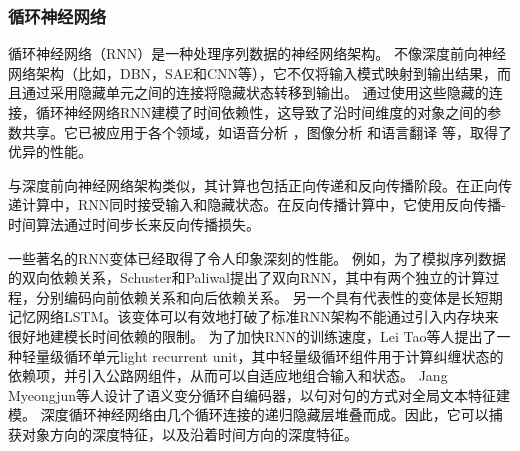 \subsubsection{循环神经网络}
循环神经网络（RNN）是一种处理序列数据的神经网络架构。%
不像深度前向神经网络架构（比如，DBN，SAE和CNN等），它不仅将输入模式映射到输出结果，而且通过采用隐藏单元之间的连接将隐藏状态转移到输出。%
通过使用这些隐藏的连接，循环神经网络RNN建模了时间依赖性，这导致了沿时间维度的对象之间的参数共享。它已被应用于各个领域，如语音分析%
，图像分析%
和语言翻译%
等，取得了优异的性能。

与深度前向神经网络架构类似，其计算也包括正向传递和反向传播阶段。在正向传递计算中，RNN同时接受输入和隐藏状态。在反向传播计算中，它使用反向传播-时间算法通过时间步长来反向传播损失。

一些著名的RNN变体已经取得了令人印象深刻的性能。%
例如，为了模拟序列数据的双向依赖关系，Schuster和Paliwal提出了双向RNN，其中有两个独立的计算过程，分别编码向前依赖关系和向后依赖关系。%
另一个具有代表性的变体是长短期记忆网络LSTM。该变体可以有效地打破了标准RNN架构不能通过引入内存块来很好地建模长时间依赖的限制。%
为了加快RNN的训练速度，Lei Tao等人提出了一种轻量级循环单元light recurrent unit，其中轻量级循环组件用于计算纠缠状态的依赖项，并引入公路网组件，从而可以自适应地组合输入和状态。%
Jang Myeongjun等人设计了语义变分循环自编码器，以句对句的方式对全局文本特征建模。%
深度循环神经网络由几个循环连接的递归隐藏层堆叠而成。因此，它可以捕获对象方向的深度特征，以及沿着时间方向的深度特征。

